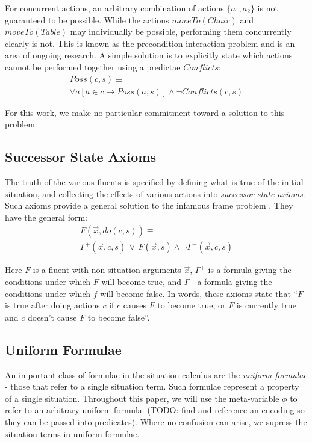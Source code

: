 \documentclass[letterpaper]{article}
\begin{document}
For concurrent actions, an arbitrary combination of actions $\{ a_{1},a_{2}\}$
is not guaranteed to be possible. While the actions $moveTo(Chair)$
and $moveTo(Table)$ may individually be possible, performing them
concurrently clearly is not. This is known as the precondition interaction
problem \cite{reiter96sc_nat_conc} and is an area of ongoing research.
A simple solution is to explicitly state which actions cannot be performed
together using a predictae $Conflicts$:
\begin{multline}
Poss(c,s)\equiv\\
\forall a\left[a\in c\rightarrow Poss(a,s)\right]\wedge\neg Conflicts(c,s)
\end{multline}

For this work, we make no particular commitment toward a solution
to this problem.


\subsection{Successor State Axioms}

The truth of the various fluents is specified by defining what is
true of the initial situation, and collecting the effects of various
actions into \emph{successor state axioms}. Such axioms provide a
general solution to the infamous frame problem \cite{reiter91frameprob}.
They have the general form:
\begin{multline}
F(\overrightarrow{x},do(c,s))\equiv\\
\Gamma^{+}(\overrightarrow{x},c,s)\,\vee\, F(\overrightarrow{x},s)\wedge\neg\Gamma^{-}(\overrightarrow{x},c,s)
\end{multline}


Here $F$ is a fluent with non-situation arguments $\overrightarrow{x}$,
$\Gamma^{+}$ is a formula giving the conditions under which $F$
will become true, and $\Gamma^{-}$ a formula giving the conditions
under which $f$ will become false. In words, these axioms state that
{}``$F$ is true after doing actions $c$ if $c$ causes $F$ to
become true, or $F$ is currently true and $c$ doesn't cause $F$
to become false''.


\subsection{Uniform Formulae}

An important class of formulae in the situation calculus are the \emph{uniform
formulae} - those that refer to a single situation term. Such formulae
represent a property of a single situation. Throughout this paper,
we will use the meta-variable $\phi$ to refer to an arbitrary uniform
formula. (TODO: find and reference an encoding so they can be passed
into predicates). Where no confusion can arise, we supress the situation
terms in uniform formulae.
\end{document}
